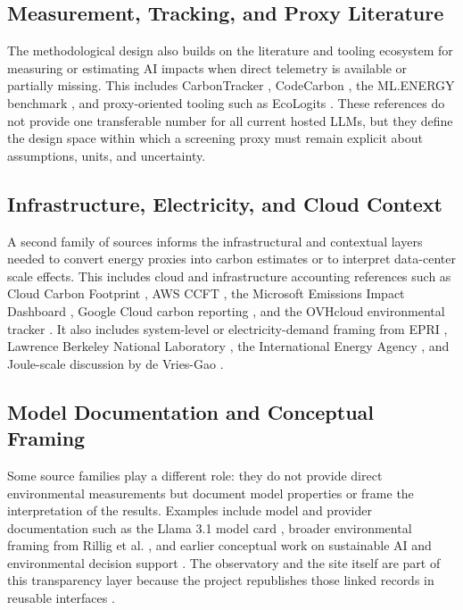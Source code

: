 \documentclass[10pt,a4paper]{article}
\begin{document}
\subsection{Measurement, Tracking, and Proxy Literature}
The methodological design also builds on the literature and tooling ecosystem for measuring or estimating AI impacts when direct telemetry is available or partially missing. This includes CarbonTracker \cite{anthony2020carbontracker}, CodeCarbon \cite{codecarbon2026}, the ML.ENERGY benchmark \cite{mlenergy2025}, and proxy-oriented tooling such as EcoLogits \cite{ecologits2026}. These references do not provide one transferable number for all current hosted LLMs, but they define the design space within which a screening proxy must remain explicit about assumptions, units, and uncertainty.

\subsection{Infrastructure, Electricity, and Cloud Context}
A second family of sources informs the infrastructural and contextual layers needed to convert energy proxies into carbon estimates or to interpret data-center scale effects. This includes cloud and infrastructure accounting references such as Cloud Carbon Footprint \cite{cloudcarbonfootprint2026}, AWS CCFT \cite{awsccft2026}, the Microsoft Emissions Impact Dashboard \cite{azureeid2026}, Google Cloud carbon reporting \cite{gcloudcarbon2026}, and the OVHcloud environmental tracker \cite{ovhtracker2024}. It also includes system-level or electricity-demand framing from EPRI \cite{epri2024}, Lawrence Berkeley National Laboratory \cite{lbl2025,shehabi2024report}, the International Energy Agency \cite{iea2025}, and Joule-scale discussion by de Vries-Gao \cite{devriesgao2025joule}.

\subsection{Model Documentation and Conceptual Framing}
Some source families play a different role: they do not provide direct environmental measurements but document model properties or frame the interpretation of the results. Examples include model and provider documentation such as the Llama 3.1 model card \cite{meta2024llama}, broader environmental framing from Rillig et al. \cite{rillig2023}, and earlier conceptual work on sustainable AI and environmental decision support \cite{pachot2022book,pachot2023sustainableai}. The observatory and the site itself are part of this transparency layer because the project republishes those linked records in reusable interfaces \cite{impactllmrepo2026}.
\end{document}

